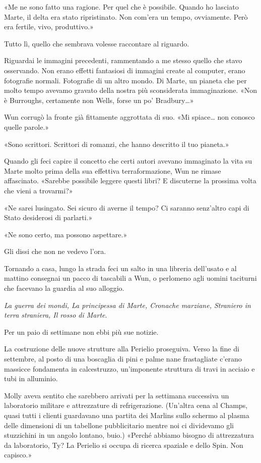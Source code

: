 «Me ne sono fatto una ragione. Per quel che è possibile. Quando ho
lasciato Marte, il delta era stato ripristinato. Non com'era un tempo,
ovviamente. Però era fertile, vivo, produttivo.»

Tutto lì, quello che sembrava volesse raccontare al riguardo.

Riguardai le immagini precedenti, rammentando a me stesso quello che
stavo osservando. Non erano effetti fantasiosi di immagini create al
computer, erano fotografie normali. Fotografie di un altro mondo. Di
Marte, un pianeta che per molto tempo avevamo gravato della nostra più
sconsiderata immaginazione. «Non è Burroughs, certamente non Wells,
forse un po' Bradbury\ldots»

Wun corrugò la fronte già fittamente aggrottata di suo. «Mi
spiace\ldots{} non conosco quelle parole.»

«Sono scrittori. Scrittori di romanzi, che hanno descritto il tuo
pianeta.»

Quando gli feci capire il concetto che certi autori avevano immaginato
la vita su Marte molto prima della sua effettiva terraformazione, Wun ne
rimase affascinato. «Sarebbe possibile leggere questi libri? E
discuterne la prossima volta che vieni a trovarmi?»

«Ne sarei lusingato. Sei sicuro di averne il tempo? Ci saranno
senz'altro capi di Stato desiderosi di parlarti.»

«Ne sono certo, ma possono aspettare.»

Gli dissi che non ne vedevo l'ora.

Tornando a casa, lungo la strada feci un salto in una libreria
dell'usato e al mattino consegnai un pacco di tascabili a Wun, o
perlomeno agli uomini taciturni che facevano la guardia al suo alloggio.

\emph{La guerra dei mondi, La principessa di Marte, Cronache marziane,
	Straniero in terra straniera, Il rosso di Marte}.

Per un paio di settimane non ebbi più sue notizie.

\separatorefiori

La costruzione delle nuove strutture alla Perielio proseguiva. Verso la
fine di settembre, al posto di una boscaglia di pini e palme nane
frastagliate c'erano massicce fondamenta in calcestruzzo, un'imponente
struttura di travi in acciaio e tubi in alluminio.

Molly aveva sentito che sarebbero arrivati per la settimana successiva
un laboratorio militare e attrezzature di refrigerazione. (Un'altra cena
al Champs, quasi tutti i clienti guardavano una partita dei Marlins
sullo schermo al plasma delle dimensioni di un tabellone pubblicitario
mentre noi ci dividevamo gli stuzzichini in un angolo lontano, buio.)
«Perché abbiamo bisogno di attrezzatura da laboratorio, Ty? La Perielio
si occupa di ricerca spaziale e dello Spin. Non capisco.»

